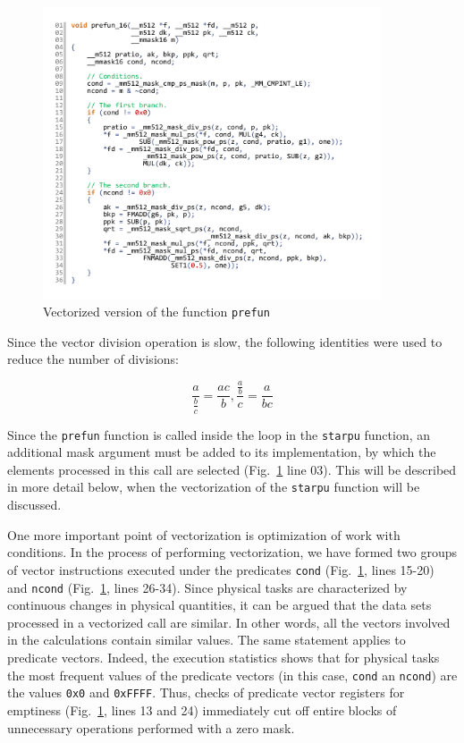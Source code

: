 \documentclass[utf8,english]{psta}%
\begin{document}
\begin{figure}
\includegraphics[width=10cm]{pics/pic_prefun_16_code}
\caption{Vectorized version of the function \texttt{prefun}}
\label{pic:prefun_16_code}
\end{figure}

Since the vector division operation is slow, the following identities were used to reduce the number of divisions:

\begin{equation}\label{eq:deldel}
\frac{a}{\frac{b}{c}} = \frac{ac}{b}, \frac{\frac{a}{b}}{c} = \frac{a}{bc}
\end{equation} 

Since the \texttt{prefun} function is called inside the loop in the \texttt{starpu} function, an additional mask argument must be added to its implementation, by which the elements processed in this call are selected (Fig.~\ref{pic:prefun_16_code} line 03).
This will be described in more detail below, when the vectorization of the \texttt{starpu} function will be discussed.

One more important point of vectorization is optimization of work with conditions.
In the process of performing vectorization, we have formed two groups of vector instructions executed under the predicates \texttt{cond} (Fig.~\ref{pic:prefun_16_code}, lines 15-20) and \texttt{ncond} (Fig.~\ref{pic:prefun_16_code}, lines 26-34).
Since physical tasks are characterized by continuous changes in physical quantities, it can be argued that the data sets processed in a vectorized call are similar.
In other words, all the vectors involved in the calculations contain similar values.
The same statement applies to predicate vectors.
Indeed, the execution statistics shows that for physical tasks the most frequent values of the predicate vectors (in this case, \texttt{cond} an \texttt{ncond}) are the values \texttt{0x0} and \texttt{0xFFFF}.
Thus, checks of predicate vector registers for emptiness (Fig.~\ref{pic:prefun_16_code}, lines 13 and 24) immediately cut off entire blocks of unnecessary operations performed with a zero mask.
\end{document}
